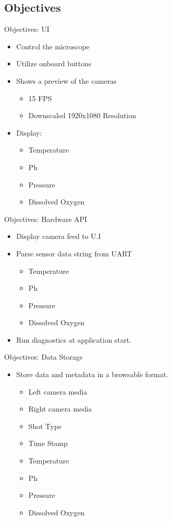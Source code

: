 \documentclass[14pt, aspectratio=169]{beamer}
\begin{document}
\subsection{Objectives}
\begin{frame}{Objectives: UI}
	\begin{itemize}
		\item Control the microscope
		\item Utilize onboard buttons
		\item Shows a preview of the cameras
		      \begin{itemize}
			      \item 15 FPS
			      \item Downscaled 1920x1080 Resolution
		      \end{itemize}
			  \item Display:
		      \begin{itemize}
			      \item Temperature
			      \item Ph
			      \item Pressure
			      \item Dissolved Oxygen
		      \end{itemize}
	\end{itemize}
\end{frame}
\begin{frame}{Objectives: Hardware API}
	\begin{itemize}
		\item Display camera feed to U.I
		\item Parse sensor data string from UART
		      \begin{itemize}
			      \item Temperature
			      \item Ph
			      \item Pressure
			      \item Dissolved Oxygen
		      \end{itemize}
		\item Run diagnostics at application start.
	\end{itemize}
\end{frame}
\begin{frame}{Objectives: Data Storage}
	\begin{itemize}
		\item Store data and metadata in a browsable format.
		      \begin{itemize}
			      \item Left camera media
			      \item Right camera media
			      \item Shot Type
			      \item Time Stamp
			      \item Temperature
			      \item Ph
			      \item Pressure
			      \item Dissolved Oxygen
		      \end{itemize}
	\end{itemize}
\end{frame}
\end{document}

